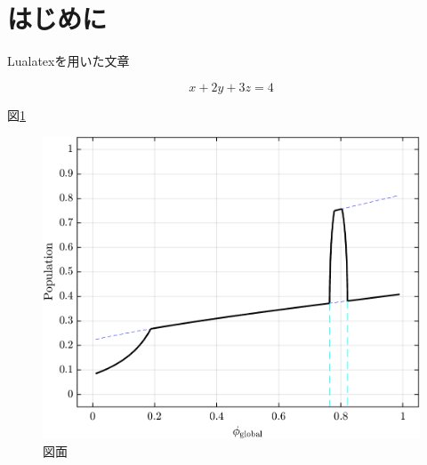 \section{はじめに}

Lualatexを用いた文章

\begin{equation}
  x+2y+3z=4
\end{equation}

図\ref{fig:ex}

\begin{figure}
  \centering\small
  \includegraphics[scale=0.9]{./fig/fig-01.png}
  \caption{図面 \label{fig:ex}}
\end{figure}

